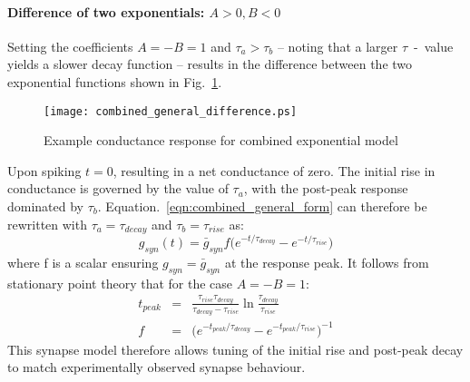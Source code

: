 \documentclass[12pt]{article}
\begin{document}
\paragraph{Difference of two exponentials: $A>0, B<0$ \newline}
\noindent Setting the coefficients $A = -B = 1$ and $\tau_a > \tau_b$ --
noting that a larger $\tau$~-~value yields a slower decay function -- results in
the difference between the two exponential functions shown in Fig.~\ref{fig:difference_exp_example}.
\begin{figure}[!h]
\begin{centering}
\texttt{[image: combined\_general\_difference.ps]}
\caption{Example conductance response for combined exponential model}
\label{fig:difference_exp_example}
\end{centering}
\end{figure}
Upon spiking $t = 0$, resulting in a net conductance of zero. The initial rise
in conductance is governed by the value of $\tau_a$, with the post-peak response
dominated by $\tau_b$. Equation.~\ref{eqn:combined_general_form} can
therefore be rewritten with $\tau_a = \tau_{decay}$ and $\tau_b = \tau_{rise}$
as:
\begin{equation}
g_{syn}(t)=\bar{g}_{syn}f\Big(e^{-t / \tau_{decay}} - e^{-t /
\tau_{rise}}\Big)
\label{eqn:}
\end{equation}
where f is a scalar ensuring $g_{syn} = \bar{g}_{syn}$ at the response peak. It
follows from stationary point theory that for the case $A = -B = 1$:
\begin{eqnarray}
t_{peak}&=&\frac{\tau_{rise}\tau_{decay}}{\tau_{decay}
- \tau_{rise}}\ln\frac{\tau_{decay}}{\tau_{rise}} \nonumber
\\
f&=&\Big( e^{-t_{peak} / \tau_{decay}} - e^{-t_{peak} / \tau_{rise}}\Big)^{-1}
\nonumber
\label{eqn:combined_exponential_diff_response}
\end{eqnarray}
This synapse model therefore allows tuning of the initial rise and post-peak
decay to match experimentally observed synapse behaviour.
\end{document}
